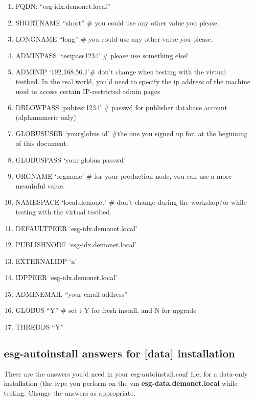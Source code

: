 \begin{enumerate}
\def\labelenumi{\arabic{enumi}.}
\item
  FQDN: ``esg-idx.demonet.local''
\item
  SHORTNAME ``short'' \# you could use any other value you please.
\item
  LONGNAME ``long'' \# you could use any other value you please.
\item
  ADMINPASS `testpass1234' \# please use something else!
\item
  ADMINIP `192.168.56.1'\# don't change when testing with the virtual testbed. In the real world, you'd need to specify the ip address of the machine used to access certain IP-restricted admin pages
\item
  DBLOWPASS `pubtest1234' \# passwd for publisher database account
  (alphanumeric only)
\item
  GLOBUSUSER `yourglobus id' \#the one you signed up for, at the
  beginning of this document.
\item
  GLOBUSPASS `your globus passwd'
\item
  ORGNAME `orgname' \# for your production node, you can use a more
  meaninful value.
\item
  NAMESPACE `local.demonet' \# don't change during the workshop/or while testing with the virtual testbed.
\item
  DEFAULTPEER `esg-idx.demonet.local'
\item
  PUBLISHNODE `esg-idx.demonet.local'
\item
  EXTERNALIDP `n'
\item
  IDPPEER `esg-idx.demonet.local'
\item
  ADMINEMAIL ``your email address''
\item
  GLOBUS ``Y'' \# set t Y for fresh install, and N for upgrade
\item
  THREDDS ``Y''
\end{enumerate}

\subsection{esg-autoinstall answers for [data] installation}

These are the answers you'd need in your esg-autoinstall.conf file, for a data-only installation (the type you perform on the vm \textbf{esg-data.demonet.local} while testing.
Change the answers as appropriate.

